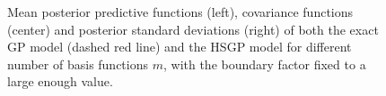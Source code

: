 \documentclass[onecolumn,a4paper,11pt]{article}
\begin{document}
\begin{figure}
\caption{Mean posterior predictive functions (left), covariance functions (center) and posterior standard deviations (right) of both the exact GP model (dashed red line) and the HSGP model for different number of basis functions $m$, with the boundary factor fixed to a large enough value.}
  \label{fig1_Post_J}
\end{figure}
\end{document}
